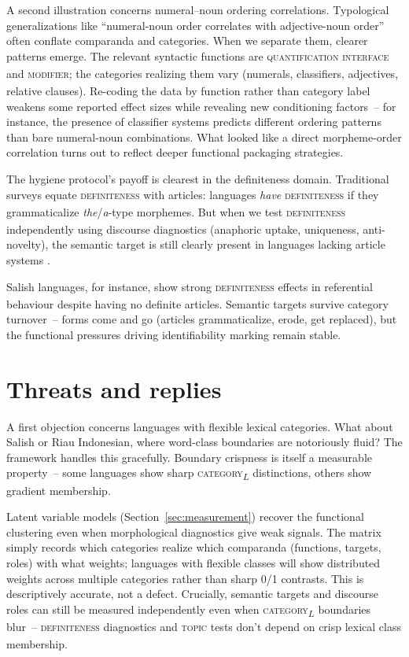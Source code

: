 \documentclass[12pt]{article}
\newcommand{\term}[1]{\textit{#1}}
\begin{document}
A second illustration concerns numeral--noun ordering correlations. Typological generalizations like \enquote{numeral-noun order correlates with adjective-noun order} often conflate comparanda and categories. When we separate them, clearer patterns emerge. The relevant syntactic functions are \textsc{quantification interface}\textsubscript{\Cross} and \textsc{modifier}\textsubscript{\Cross}; the categories realizing them vary (numerals, classifiers, adjectives, relative clauses). Re-coding the data by function rather than category label weakens some reported effect sizes while revealing new conditioning factors~-- for instance, the presence of classifier systems predicts different ordering patterns than bare numeral-noun combinations. What looked like a direct morpheme-order correlation turns out to reflect deeper functional packaging strategies.

The hygiene protocol's payoff is clearest in the definiteness domain. Traditional surveys equate \textsc{definiteness}\textsubscript{\Cross} with articles: languages \term{have} \textsc{definiteness}\textsubscript{\Cross} if they grammaticalize \textit{the}/\textit{a}-type morphemes. But when we test \textsc{definiteness}\textsubscript{\Cross} independently using discourse diagnostics (anaphoric uptake, uniqueness, anti-novelty), the semantic target is still clearly present in languages lacking article systems \parencite{Lyons1999,Matthewson2004}.

Salish languages, for instance, show strong \textsc{definiteness}\textsubscript{\Cross} effects in referential behaviour despite having no definite articles. Semantic targets survive category turnover~-- forms come and go (articles grammaticalize, erode, get replaced), but the functional pressures driving identifiability marking remain stable.

\section{Threats and replies}\label{sec:threats}
A first objection concerns languages with flexible lexical categories. What about Salish or Riau Indonesian, where word-class boundaries are notoriously fluid? The framework handles this gracefully. Boundary crispness is itself a measurable property~-- some languages show sharp \textsc{category}\textsubscript{$L$} distinctions, others show gradient membership.

Latent variable models (Section~\ref{sec:measurement}) recover the functional clustering even when morphological diagnostics give weak signals. The matrix simply records which categories realize which comparanda (functions, targets, roles) with what weights; languages with flexible classes will show distributed weights across multiple categories rather than sharp 0/1 contrasts. This is descriptively accurate, not a defect. Crucially, semantic targets and discourse roles can still be measured independently even when \textsc{category}\textsubscript{$L$} boundaries blur~-- \textsc{definiteness}\textsubscript{\Cross} diagnostics and \textsc{topic}\textsubscript{\Cross} tests don't depend on crisp lexical class membership.
\end{document}
